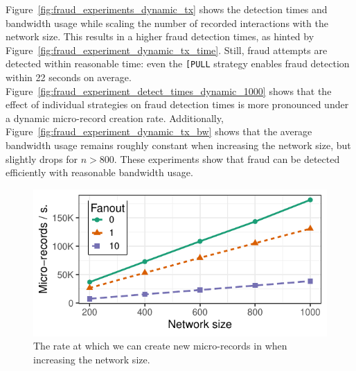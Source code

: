 Figure~\ref{fig:fraud_experiments_dynamic_tx} shows the detection times and bandwidth usage while scaling the number of recorded interactions with the network size.
This results in a higher fraud detection times, as hinted by Figure~\ref{fig:fraud_experiment_dynamic_tx_time}.
Still, fraud attempts are detected within reasonable time: even the \texttt{[PULL} strategy enables fraud detection within 22 seconds on average.
Figure~\ref{fig:fraud_experiment_detect_times_dynamic_1000} shows that the effect of individual strategies on fraud detection times is more pronounced under a dynamic micro-record creation rate.
Additionally, Figure~\ref{fig:fraud_experiment_dynamic_tx_bw} shows that the average bandwidth usage remains roughly constant when increasing the network size, but slightly drops for $ n > 800 $.
These experiments show that fraud can be detected efficiently with reasonable bandwidth usage.


\begin{figure}[b]
	\centering
	\includegraphics[width=\linewidth]{trustchain/assets/scalability}
	\caption{The rate at which we can create new micro-records in \ModelName{} when increasing the network size.}
	\label{fig:scalability}
\end{figure}

